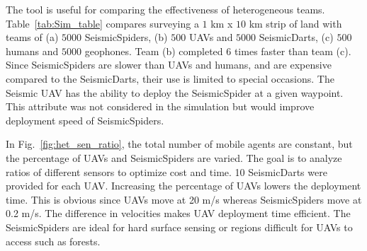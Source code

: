 The tool is useful for comparing the effectiveness of heterogeneous teams.  Table~\ref{tab:Sim_table} compares surveying a $1$ km x $10$ km strip of land with teams of (a) $5000$ SeismicSpiders, (b) $500$ UAVs and $5000$ SeismicDarts, (c) $500$ humans and $5000$ geophones.  Team (b) completed $6$ times faster than team (c). 
  Since SeismicSpiders are  slower than UAVs and humans, and are expensive compared to the SeismicDarts, their use is limited to special occasions. The Seismic UAV has the ability to deploy the SeismicSpider at a given waypoint. This attribute was not considered in the simulation but would improve deployment speed of SeismicSpiders.
   
In Fig.~\ref{fig:het_sen_ratio}, the total number of mobile agents are constant, but the percentage of UAVs and SeismicSpiders are varied. The goal is to analyze ratios of different sensors to optimize cost and time. 10 SeismicDarts were provided for each UAV. Increasing the percentage of UAVs lowers the deployment time. This is obvious since UAVs move at 20 m/s whereas SeismicSpiders move at 0.2 m/s. The difference in velocities makes UAV deployment time efficient. The SeismicSpiders are ideal for hard surface sensing or regions difficult for UAVs to access such as  forests.

